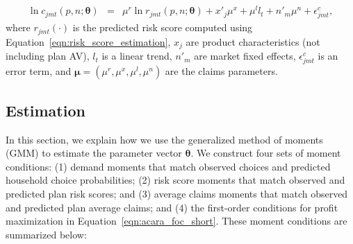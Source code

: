 \documentclass[12pt]{article}
\begin{document}
\vspace{-0.4in}	
\begin{eqnarray}
\label{eqn:avg_claims_estimation}
	\ln c_{jmt}(\textit{p},\textit{n};\boldsymbol{\theta}) &=& \mu^r \ln r_{jmt}(\textit{p},\textit{n};\boldsymbol{\theta}) + x'_j  \mu^{x}  + \mu^l l_t +   n'_m \mu^{n} + \epsilon_{jmt}^c,
\end{eqnarray}
where $r_{jmt}(\cdot)$ is the predicted risk score computed using Equation~\eqref{eqn:risk_score_estimation}, $x_j$ are product characteristics (not including plan AV), $l_t$ is a linear trend, $n'_m$ are market fixed effects, $\epsilon_{jmt}^c$ is an error term, and  $\boldsymbol{\mu} = (\mu^r,\mu^x,\mu^l,\mu^n)$ are the claims parameters. 

\subsection{Estimation}
\label{subsec:steering-methods}

In this section, we explain how we use the generalized method of moments (GMM) to estimate the parameter vector $\boldsymbol{\theta}$.  We construct four sets of moment conditions: (1) demand moments that match observed choices and predicted household choice probabilities; (2) risk score moments that match observed and predicted plan risk scores; and (3) average claims moments that match observed and predicted plan average claims; and (4) the first-order conditions for profit maximization in Equation~\eqref{eqn:acara_foc_short}. These moment conditions are summarized below:
\end{document}
